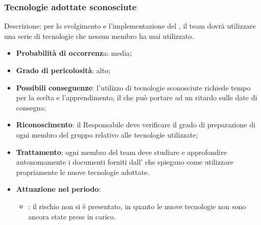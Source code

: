 \documentclass[PianoDiProgetto.tex]{subfiles}
\begin{document}
		\subsubsection{Tecnologie adottate sconosciute}
			\label{sec:tas}
Descrizione: per lo svolgimento e l'implementazione del , il team dovrà utilizzare una serie di tecnologie che nessun membro ha mai utilizzato.
	\begin{itemize}
		\item \textbf{Probabilità di occorrenz}a: media;
		\item \textbf{Grado di pericolosità}: alto;
		\item \textbf{Possibili conseguenze}: l’utilizzo di tecnologie sconosciute richiede tempo per la scelta e l’apprendimento, il che può portare ad un ritardo sulle date di consegna;
	
		\item \textbf{Riconoscimento}: il Responsabile deve verificare il grado di preparazione di ogni membro del gruppo relativo alle tecnologie utilizzate;
		\item \textbf{Trattamento}: ogni membro del team deve studiare e approfondire autonomamente i documenti forniti dall'\AMM{} che spiegano come utilizzare propriamente le nuove tecnologie adottate.
		\item \textbf{Attuazione nel periodo}: 
			\begin{itemize}
				\item \ARdoc : il rischio non si è presentato, in quanto le nuove tecnologie non sono ancora state prese in carico.
			\end{itemize}

	\end{itemize}
	
\end{document}

